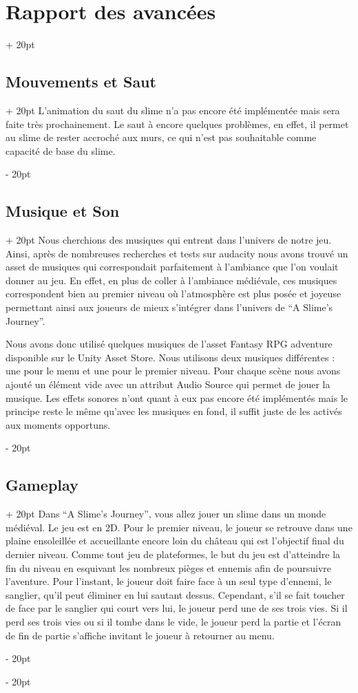\documentclass[a4paper, 12pt, twoside]{article}
\newcommand{\ind}[1][20pt]{\advance\leftskip + #1}
\newcommand{\deind}[1][20pt]{\advance\leftskip - #1}
\newenvironment{indt}[2][20pt]{#2 \par \ind[#1]}{\par \deind} %
\begin{document}
\begin{indt}{\section{Rapport des avancées}}
\begin{indt}{\subsection{Mouvements et Saut}}
            L'animation du saut du slime n'a pas encore été implémentée mais sera faite très prochainement. Le saut à encore quelques problèmes, en effet, il permet au slime de rester accroché aux murs, ce qui n'est pas souhaitable comme capacité de base du slime.

        \end{indt}

        \begin{indt}{\subsection{Musique et Son}}
            Nous cherchions des musiques qui entrent dans l'univers de notre jeu. Ainsi, après de nombreuses recherches et tests sur audacity nous avons trouvé un asset de musiques qui correspondait parfaitement à l'ambiance que l'on voulait donner au jeu. En effet, en plus de coller à l'ambiance médiévale, ces musiques correspondent bien au premier niveau où l'atmosphère est plus posée et joyeuse permettant ainsi aux joueurs de mieux s'intégrer dans l'univers de “A Slime's Journey”.

            Nous avons donc utilisé quelques musiques de l'asset Fantasy RPG adventure disponible sur le Unity Asset Store. Nous utilisons deux musiques différentes : une pour le menu et une pour le premier niveau. Pour chaque scène nous avons ajouté un élément vide avec un attribut Audio Source qui permet de jouer la musique. Les effets sonores n'ont quant à eux pas encore été implémentés mais le principe reste le même qu'avec les musiques en fond, il suffit juste de les activés aux moments opportuns. 

        \end{indt}

        \begin{indt}{\subsection{Gameplay}}
            Dans “A Slime's Journey”, vous allez jouer un slime dans un monde médiéval. Le jeu est en 2D. Pour le premier niveau, le joueur se retrouve dans une plaine ensoleillée et accueillante encore loin du château qui est l'objectif final du dernier niveau. Comme tout jeu de plateformes, le but du jeu est d'atteindre la fin du niveau  en esquivant les nombreux pièges et ennemis afin de poursuivre l'aventure. Pour l'instant, le joueur doit faire face à un seul type d'ennemi, le sanglier, qu'il peut éliminer en lui sautant dessus. Cependant, s'il se fait toucher de face par le sanglier qui court vers lui, le joueur perd une de ses trois vies. Si il perd ses trois vies ou si il tombe dans le vide, le joueur perd la partie et l'écran de fin de partie s'affiche invitant le joueur à retourner au menu. 


\end{indt}
\end{indt}
\end{document}
